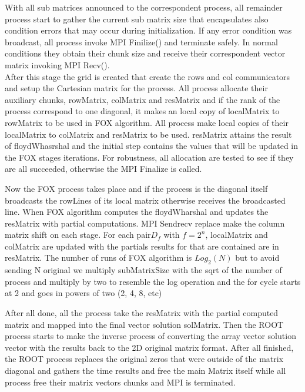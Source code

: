 \documentclass[10pt,a4paper,final]{report}
\begin{document}
With all sub matrices announced to the correspondent process, all remainder process  start to gather the current sub matrix size that encapsulates also condition errors that may occur during initialization. If any error condition was broadcast, all process invoke MPI Finilize() and terminate safely. In normal conditions they obtain their chunk size and receive their correspondent vector matrix invoking MPI Recv().\\

After this stage the grid is created that create the rows and col communicators and setup the Cartesian matrix for the process.
All process allocate their auxiliary chunks, rowMatrix, colMatrix and resMatrix and if the rank of the process correspond to one diagonal, it makes an local copy of localMatrix to rowMatrix to be used in FOX algorithm. All process make local copies of their localMatrix to colMatrix and resMatrix to be used. resMatrix attains the result of  floydWhasrshal and the initial step contains the values that will be updated in the FOX stages iterations. For robustness, all allocation are tested to see if they are all succeeded, otherwise the MPI Finalize is called.
 
Now the FOX process takes place and if  the process is the diagonal itself broadcasts the rowLines of its local matrix otherwise receives the broadcasted line. When FOX algorithm computes the floydWharshal and updates the resMatrix with partial computations. MPI Sendrecv replace make the column matrix shift on each stage.  For each pair$ D_f$ with $f=2^n$, localMatrix and colMatrix are updated with the partials results for that are contained are in resMatrix. The number of runs of FOX algorithm is $Log_2(N)$ but to avoid sending N original we multiply subMatrixSize with the sqrt of the number of process and multiply by two to resemble the log operation and the for cycle starts at 2 and goes in powers of two (2, 4, 8, etc) 

After all done, all the process take the resMatrix with the partial computed matrix and mapped into the final vector solution solMatrix. Then the ROOT process starts to make the inverse process of converting the array vector solution vector with the results back to the 2D original matrix format. After all finished, the ROOT process replaces the original zeros that were outside of the matrix diagonal and gathers the  time results and free the main Matrix itself while all process free their matrix vectors chunks and MPI is terminated.
\end{document}
